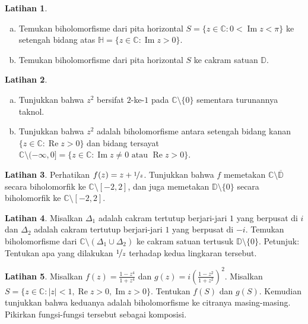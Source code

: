 \documentclass[12pt,openany]{book}
\renewcommand{\Re}{\operatorname{Re}}
\renewcommand{\Im}{\operatorname{Im}}
\newcommand{\sabs}[1]{\lvert {#1} \rvert}
\newcommand{\C}{{\mathbb{C}}}
\newcommand{\D}{{\mathbb{D}}}
\newcommand{\bH}{{\mathbb{H}}}
\theoremstyle{plain}
\theoremstyle{remark}
\theoremstyle{definition}
\newenvironment{exbox}{%
    \def\FrameCommand{\vrule width 1pt \relax\hspace{10pt}}%
    \MakeFramed{\advance\hsize-\width\FrameRestore}%
}{%
    \endMakeFramed
}
\newenvironment{exparts}{%
    \leavevmode\begin{enumerate}[a),noitemsep,topsep=0pt,parsep=0pt,partopsep=0pt]
}{%
    \end{enumerate}
}
\theoremstyle{exercise}
\newtheorem{exercise}{Latihan}[section]
\theoremstyle{example}
\begin{document}
\begin{exbox}
\begin{exercise}
\begin{exparts}
\item
Temukan biholomorfisme dari pita horizontal
$S = \{ z \in \C : 0 < \Im z < \pi \}$ ke
setengah bidang atas $\bH = \{ z \in \C : \Im z > 0 \}$.
\item
Temukan biholomorfisme dari pita horizontal
$S$ ke cakram satuan $\D$.
\end{exparts}
\end{exercise}

\begin{exercise}
\pagebreak[2]
\begin{exparts}
\item
Tunjukkan bahwa $z^2$ bersifat $2$-ke-$1$ pada $\C \setminus \{ 0 \}$ sementara
turunannya taknol.
\item
Tunjukkan bahwa $z^2$ adalah biholomorfisme antara setengah bidang kanan
$\{ z \in \C : \Re z > 0 \}$
dan bidang tersayat $\C \setminus (-\infty,0] = \{ z \in \C : \Im z \neq 0 \text{ atau } \Re z > 0 \}$.
\end{exparts}
\end{exercise}

\begin{exercise} \label{exercise:segmentcomplement}
Perhatikan $f(z) = z+ \nicefrac{1}{z}$.  Tunjukkan bahwa $f$ memetakan $\C \setminus
\overline{\D}$ secara biholomorfik ke $\C \setminus [-2,2]$, dan juga memetakan
$\D \setminus \{ 0 \}$ secara biholomorfik ke $\C \setminus [-2,2]$.
\end{exercise}

\begin{exercise}
Misalkan $\Delta_1$ adalah cakram tertutup berjari-jari $1$ yang berpusat di $i$ dan
$\Delta_2$ adalah cakram tertutup berjari-jari $1$ yang berpusat di $-i$.
Temukan biholomorfisme dari $\C \setminus (\Delta_1 \cup \Delta_2)$
ke cakram satuan tertusuk $\D \setminus \{ 0 \}$.
Petunjuk: Tentukan apa yang dilakukan $\nicefrac{1}{z}$ terhadap kedua lingkaran tersebut.
\end{exercise}

\begin{exercise}
Misalkan $f(z) = \frac{1-z^4}{1+z^4}$ dan $g(z) = i {\left( \frac{1-z^2}{1+z^2}
\right)}^2$.  Misalkan $S = \{ z \in \C : \sabs{z} < 1, \Re z > 0, \Im z > 0 \}$.
Tentukan $f(S)$ dan $g(S)$.  Kemudian tunjukkan bahwa keduanya adalah biholomorfisme ke
citranya masing-masing.  Pikirkan fungsi-fungsi tersebut sebagai komposisi.
\end{exercise}


\end{exbox}
\end{document}
